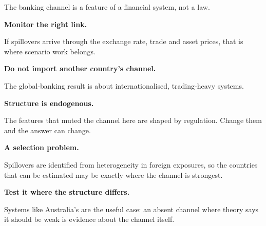 \documentclass[aspectratio=169,11pt]{beamer}
\def\decksource{}
\newcommand{\src}[1]{\def\decksource{#1}}
\newcommand{\kicker}[1]{%
  {\fontsize{7.6}{9}\selectfont\color{teal}\bfseries\textls[130]{\MakeUppercase{#1}}}\par
  \vspace{0.16cm}}
\newcommand{\headline}[1]{%
  {\rmfamily\fontsize{18.4}{21.8}\selectfont\color{ink}#1\par}
  \vspace{0.34cm}}
\newcommand{\bodyfont}{\fontsize{9.7}{12.9}\selectfont}
\newcommand{\smallfont}{\fontsize{8.2}{11.2}\selectfont}
\newcommand{\notefont}{\fontsize{7.1}{9.4}\selectfont}
\newcommand{\leadin}[1]{{\bfseries\color{teal}#1}}
\begin{document}
\begin{frame}[t]
\src{Section 6.2; Section 7}
\vspace*{0.42cm}
\kicker{9 \enspace·\enspace Implications}
\headline{The banking channel is a feature of a financial system, not a law.}
\bodyfont

\begin{minipage}[t]{6.55cm}
{\notefont\color{teal}\bfseries{}}\par
\vspace{0.24cm}
\leadin{Monitor the right link.}\\[0.03cm]
{\smallfont
If spillovers arrive through the exchange rate, trade and asset prices, that is where scenario work
belongs.\par}
\vspace{0.24cm}
\leadin{Do not import another country's channel.}\\[0.03cm]
{\smallfont
The global-banking result is about internationalised, trading-heavy systems.\par}
\vspace{0.24cm}
\leadin{Structure is endogenous.}\\[0.03cm]
{\smallfont
The features that muted the channel here are shaped by regulation. Change them and the answer can
change.\par}
\end{minipage}\hfill
\begin{minipage}[t]{6.2cm}
{\notefont\color{teal}\bfseries{}}\par
\vspace{0.24cm}
\leadin{A selection problem.}\\[0.03cm]
{\smallfont
Spillovers are identified from heterogeneity in foreign exposures, so the countries that can be
estimated may be exactly where the channel is strongest.\par}
\vspace{0.24cm}
\leadin{Test it where the structure differs.}\\[0.03cm]
{\smallfont
Systems like Australia's are the useful case: an absent channel where theory says it should be weak is
evidence about the channel itself.\par}
\end{minipage}
\end{frame}
\end{document}

